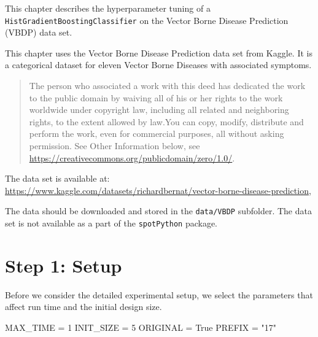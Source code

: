 \documentclass[
  letterpaper,
  DIV=11,
  numbers=noendperiod]{scrreprt}
\newenvironment{Shaded}{\begin{snugshade}}{\end{snugshade}}
\newcommand{\DecValTok}[1]{\textcolor[rgb]{0.68,0.00,0.00}{#1}}
\newcommand{\NormalTok}[1]{\textcolor[rgb]{0.00,0.23,0.31}{#1}}
\newcommand{\OperatorTok}[1]{\textcolor[rgb]{0.37,0.37,0.37}{#1}}
\newcommand{\StringTok}[1]{\textcolor[rgb]{0.13,0.47,0.30}{#1}}
\newcommand{\VariableTok}[1]{\textcolor[rgb]{0.07,0.07,0.07}{#1}}
\begin{document}
This chapter describes the hyperparameter tuning of a
\texttt{HistGradientBoostingClassifier} on the Vector Borne Disease
Prediction (VBDP) data set.

\begin{tcolorbox}[enhanced jigsaw, left=2mm, toprule=.15mm, colframe=quarto-callout-important-color-frame, leftrule=.75mm, title=\textcolor{quarto-callout-important-color}{\faExclamation}\hspace{0.5em}{Vector Borne Disease Prediction Data Set}, toptitle=1mm, opacitybacktitle=0.6, arc=.35mm, titlerule=0mm, opacityback=0, bottomtitle=1mm, coltitle=black, rightrule=.15mm, colback=white, colbacktitle=quarto-callout-important-color!10!white, breakable, bottomrule=.15mm]

This chapter uses the Vector Borne Disease Prediction data set from
Kaggle. It is a categorical dataset for eleven Vector Borne Diseases
with associated symptoms.

\begin{quote}
The person who associated a work with this deed has dedicated the work
to the public domain by waiving all of his or her rights to the work
worldwide under copyright law, including all related and neighboring
rights, to the extent allowed by law.You can copy, modify, distribute
and perform the work, even for commercial purposes, all without asking
permission. See Other Information below, see
\url{https://creativecommons.org/publicdomain/zero/1.0/}.
\end{quote}

The data set is available at:
\url{https://www.kaggle.com/datasets/richardbernat/vector-borne-disease-prediction},

The data should be downloaded and stored in the \texttt{data/VBDP}
subfolder. The data set is not available as a part of the
\texttt{spotPython} package.

\end{tcolorbox}

\hypertarget{sec-setup-17}{%
\section{Step 1: Setup}\label{sec-setup-17}}

Before we consider the detailed experimental setup, we select the
parameters that affect run time and the initial design size.

\begin{Shaded}
\begin{Highlighting}[]
\NormalTok{MAX\_TIME }\OperatorTok{=} \DecValTok{1}
\NormalTok{INIT\_SIZE }\OperatorTok{=} \DecValTok{5}
\NormalTok{ORIGINAL }\OperatorTok{=} \VariableTok{True}
\NormalTok{PREFIX }\OperatorTok{=} \StringTok{"17"}
\end{Highlighting}
\end{Shaded}
\end{document}
